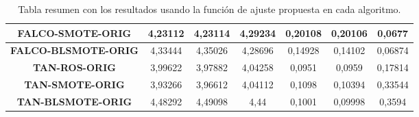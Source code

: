 \begin{table}[H]
{\begin{tabular}{|ccccccc|}
\multicolumn{1}{|c|}{\textbf{FALCO-SMOTE-ORIG}}   & \multicolumn{1}{c|}{4,23112}           & \multicolumn{1}{c|}{4,23114}             & \multicolumn{1}{c|}{4,29234}       & \multicolumn{1}{c|}{0,20108}           & \multicolumn{1}{c|}{0,20106}             & 0,0677        \\ \hline
\multicolumn{1}{|c|}{\textbf{FALCO-BLSMOTE-ORIG}} & \multicolumn{1}{c|}{4,33444}           & \multicolumn{1}{c|}{4,35026}             & \multicolumn{1}{c|}{4,28696}       & \multicolumn{1}{c|}{0,14928}           & \multicolumn{1}{c|}{0,14102}             & 0,06874       \\ \hline
\multicolumn{1}{|c|}{\textbf{TAN-ROS-ORIG}}       & \multicolumn{1}{c|}{3,99622}           & \multicolumn{1}{c|}{3,97882}             & \multicolumn{1}{c|}{4,04258}       & \multicolumn{1}{c|}{0,0951}            & \multicolumn{1}{c|}{0,0959}              & 0,17814       \\ \hline
\multicolumn{1}{|c|}{\textbf{TAN-SMOTE-ORIG}}     & \multicolumn{1}{c|}{3,93266}           & \multicolumn{1}{c|}{3,96612}             & \multicolumn{1}{c|}{4,04112}       & \multicolumn{1}{c|}{0,1098}            & \multicolumn{1}{c|}{0,10394}             & 0,33544       \\ \hline
\multicolumn{1}{|c|}{\textbf{TAN-BLSMOTE-ORIG}}   & \multicolumn{1}{c|}{4,48292}           & \multicolumn{1}{c|}{4,49098}             & \multicolumn{1}{c|}{4,44}          & \multicolumn{1}{c|}{0,1001}            & \multicolumn{1}{c|}{0,09998}             & 0,3594        \\ \hline
\end{tabular}%
}
\caption{Tabla resumen con los resultados usando la función de ajuste propuesta en cada algoritmo.}\label{resumenDEFECTO}
\end{table}


